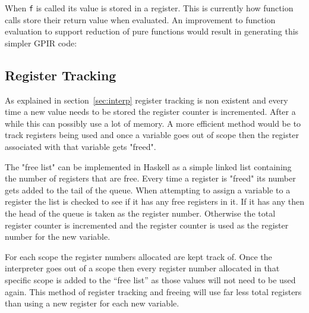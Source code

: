 

When \texttt{f} is called its value is stored in a register. This is currently how function calls
store their return value when evaluated. An improvement to function evaluation to support
reduction of pure functions would result in generating this simpler GPIR code:




\subsection{Register Tracking}
As explained in section~\ref{sec:interp} register tracking is non existent and every
time a new value needs to be stored the register counter is incremented. After a while this
can possibly use a lot of memory. A more efficient method would be to track registers
being used and once a variable goes out of scope then the register associated
with that variable gets "freed".

The "free list" can be implemented in Haskell as a simple linked list containing the number
of registers that are free. Every time a register is "freed" its number gets added
to the tail of the queue. When attempting to assign a variable to a register the list is checked
to see if it has any free registers in it. If it has any then the head of the queue is taken
as the register number. Otherwise the total register counter is incremented and the 
register counter is used as the register number for the new variable.

For each scope the register numbers allocated are kept track of. Once the interpreter
goes out of a scope then every register number allocated in that specific scope
is added to the ``free list'' as those values will not need to be used again.
This method of register tracking and freeing will use far less total registers
than using a new register for each new variable.
